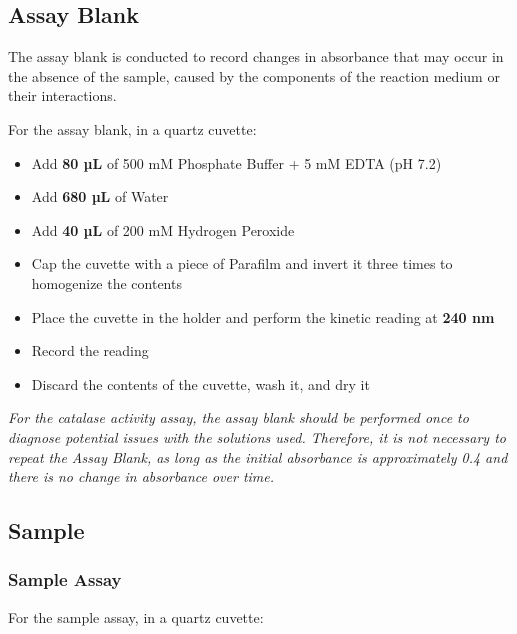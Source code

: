 \documentclass[
  9pt,
  american,
  a5paper,
  extrafontsizes,onecolumn,openright
  ]{memoir}
\providecommand{\tightlist}{%
  \setlength{\itemsep}{0pt}\setlength{\parskip}{0pt}}
\newlength{\rf}
\begin{document}
\subsection{Assay Blank}\label{cat_assay_blank}

The assay blank is conducted to record changes in absorbance that may occur in the absence of the sample, caused by the components of the reaction medium or their interactions.

For the assay blank, in a quartz cuvette:

\begin{itemize}
\tightlist
\item
  Add \textbf{80 µL} of 500 mM Phosphate Buffer + 5 mM EDTA (pH 7.2)
\item
  Add \textbf{680 µL} of Water
\item
  Add \textbf{40 µL} of 200 mM Hydrogen Peroxide
\item
  Cap the cuvette with a piece of Parafilm and invert it three times to homogenize the contents
\item
  Place the cuvette in the holder and perform the kinetic reading at \textbf{240 nm}
\item
  Record the reading
\item
  Discard the contents of the cuvette, wash it, and dry it
\end{itemize}

\begin{greybox}[frametitle = Note]
\emph{For the catalase activity assay, the assay blank should be performed once to diagnose potential issues with the solutions used. Therefore, it is not necessary to repeat the Assay Blank, as long as the initial absorbance is approximately 0.4 and there is no change in absorbance over time.}

\end{greybox}

\subsection{Sample}\label{sample}

\subsubsection{Sample Assay}\label{cat_smp_assay}

For the sample assay, in a quartz cuvette:
\end{document}
